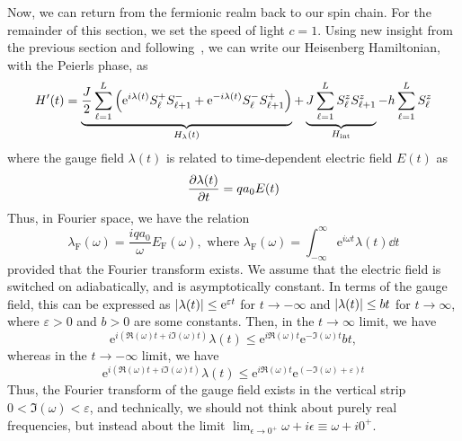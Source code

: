 Now, we can return from the fermionic realm back to our spin chain. For the remainder of this section, we set
the speed of light \(c = 1\). Using new insight from the previous section and following~\textcite{Gohmann2022}, we can write our Heisenberg
Hamiltonian, with the Peierls phase, as
\begin{equation}
    H^{\prime}(t) = \underbrace{\frac{J}{2} \sum_{\ell=1}^{L} \left(\mathrm{e}^{i \lambda(t)} S^{+}_{\ell} S^{-}_{\ell+1} + \mathrm{e}^{-i \lambda(t)} S^{-}_{\ell}S^{+}_{\ell+1} \right)}_{H_{\lambda }(t)}
    + \underbrace{J \sum_{\ell=1}^{L} S^{z}_{\ell}S^{z}_{\ell+1}}_{H_{\text{int}}}
    - h \sum_{\ell=1}^{L} S^{z}_{\ell}
\end{equation}
where the gauge field \(\lambda(t)\) is related to time-dependent electric field \(E(t)\) as
\begin{equation}
    \pdv{\lambda(t)}{t} =  q a_0 E(t)
\end{equation}
Thus, in Fourier space, we have the relation
\begin{equation}
    \lambda_{\mathrm{F}} (\omega) = \frac{i q a_0}{\omega} E_{\mathrm{F}} (\omega), \text{ where } \lambda_{\mathrm{F}} (\omega) = \int_{-\infty}^{\infty} \mathrm{e}^{i \omega t} \lambda(t)\dd{t}
\end{equation}
provided that the Fourier transform exists. We assume that the electric field is switched on adiabatically, and
is asymptotically constant. In terms of the gauge field, this can be expressed as
\(\abs{\lambda (t)} \leq \mathrm{e}^{\varepsilon t} \) for \(t\to -\infty \) and
\(\abs{\lambda (t)} \leq b t \) for \(t\to \infty \), where \(\varepsilon > 0\) and \(b>0\) are some constants.
Then, in the \( t \to \infty \) limit, we have \[\mathrm{e}^{i (\Re(\omega) t + i \Im(\omega) t )} \lambda (t)
    \leq \mathrm{e}^{i \Re (\omega) t}  \mathrm{e}^{- \Im (\omega)  t} b t,\]
whereas in the \(t \to -\infty \) limit,
we have \[\mathrm{e}^{i (\Re (\omega) t + i \Im (\omega) t )} \lambda (t) \leq \mathrm{e}^{i \Re (\omega) t}
    \mathrm{e}^{(- \Im (\omega) + \varepsilon )t}\]
Thus, the Fourier transform of the gauge field exists in the
vertical strip \(0 < \Im (\omega) < \varepsilon \), and technically, we should not think about purely
real frequencies, but instead about the limit \(\lim_{\epsilon \to 0^+} \omega + i \epsilon \equiv \omega + i0^{+}  \).

